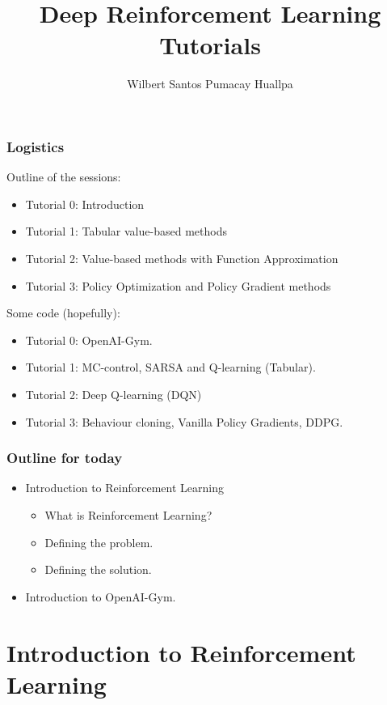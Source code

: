 \documentclass{beamer}
\title{Deep Reinforcement Learning Tutorials}
\author{Wilbert Santos Pumacay Huallpa}
\begin{document}
\begin{frame}
    \titlepage
\end{frame}

\begin{frame}
    \frametitle{Logistics}
    Outline of the sessions:
    \begin{itemize}
        \item Tutorial 0: Introduction
        \item Tutorial 1: Tabular value-based methods
        \item Tutorial 2: Value-based methods with Function Approximation
        \item Tutorial 3: Policy Optimization and Policy Gradient methods
    \end{itemize}

    \pause

    Some code (hopefully):
    \begin{itemize}
        \item Tutorial 0: OpenAI-Gym.
        \item Tutorial 1: MC-control, SARSA and Q-learning (Tabular).
        \item Tutorial 2: Deep Q-learning (DQN)
        \item Tutorial 3: Behaviour cloning, Vanilla Policy Gradients, DDPG.
    \end{itemize}
\end{frame}

\begin{frame}
    \frametitle{Outline for today}
    \begin{itemize}
        \item Introduction to Reinforcement Learning
            \begin{itemize}
                \item What is Reinforcement Learning?
                \item Defining the problem.
                \item Defining the solution.
            \end{itemize}
        \item Introduction to OpenAI-Gym.
    \end{itemize}
\end{frame}

\section{Introduction to Reinforcement Learning}






\end{document}
